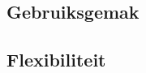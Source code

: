 \subsection{Gebruiksgemak}
\label{subsec:gebruiksgemak-decl}

\subsection{Flexibiliteit}
\label{subsec:flexibiliteit-decl}



%

